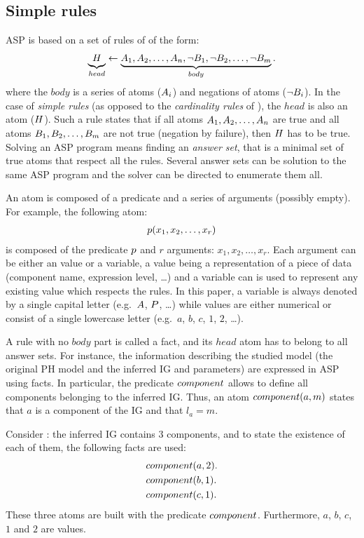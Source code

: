 \subsection{Simple rules}\label{sssec:simple_rules}
ASP is based on a set of rules of of the form:
\begin{align*}
  \underbrace{{\ }H_{\ }}_{head} \leftarrow \underbrace{A_1, A_2, \dots, A_n, \neg B_1, \neg B_2, \dots, \neg B_m}_{body}.
\end{align*}
where the $body$ is a series of atoms ($A_i$) and negations of atoms ($\neg B_i$).
In the case of \emph{simple rules} (as opposed to the \emph{cardinality rules} of ), the $head$ is also an atom ($H$).
Such a rule states that if all atoms $A_1, A_2, \dots, A_n$ are true
and all atoms $B_1, B_2, \dots, B_m$ are not true (negation by failure), then $H$ has to be true.
Solving an ASP program means finding an \emph{answer set}, that is a minimal set of true atoms that respect all the rules.
Several answer sets can be solution to the same ASP program and the solver can be directed to enumerate them all.

An atom is composed of a predicate and a series of arguments (possibly empty).
For example, the following atom:
\begin{align*}
  p(x_1, x_2, \dots, x_r)
\end{align*}
is composed of the predicate $p$ and $r$ arguments: $x_1, x_2, \dots, x_r$.
Each argument can be either an value or a variable,
a value being a representation of a piece of data (component name, expression level, …)
and a variable can is used to represent any existing value which respects the rules.
In this paper, a variable is always denoted by a single capital letter (e.g.~$A$, $P$, …)
while values are either numerical or consist of a single lowercase letter (e.g.~$a$, $b$, $c$, $1$, $2$, …).

A rule with no $body$ part is called a fact, and its $head$ atom has to belong to all answer sets.
For instance, the information describing the studied model (the original PH model and the inferred IG and parameters) are expressed in ASP using facts.
In particular, the predicate $component$ allows to define all components belonging to the inferred IG.
Thus, an atom $component(a, m)$ states that $a$ is a component of the IG and that $l_a = m$.

\begin{example}
Consider : the inferred IG contains 3 components, and to state the existence of each of them, the following facts are used:
\begin{align*}
  &component(a, 2). \\
  &component(b, 1). \\
  &component(c, 1).
\end{align*}
These three atoms are built with the predicate $component$.
Furthermore, $a$, $b$, $c$, $1$ and $2$ are values.
\end{example}

